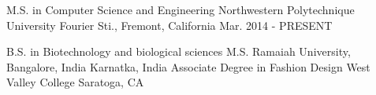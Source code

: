 

\begin{cventries}

  \cventry
    {M.S. in Computer Science and Engineering} %
    {Northwestern Polytechnique University} %
    {Fourier Sti., Fremont, California} %
    {Mar. 2014 - PRESENT} %
    {
      \begin{cvitems} %
        \item {}
      \end{cvitems}
    }
  \cventry
    {B.S. in Biotechnology and biological sciences} %
    {M.S. Ramaiah University, Bangalore, India} %
    {Karnatka, India} %
    {} %
    {} 
  \cventry
    {Associate Degree in Fashion Design} %
    {West Valley College} %
    {Saratoga, CA} %
    {} %
    {} 


\end{cventries}
